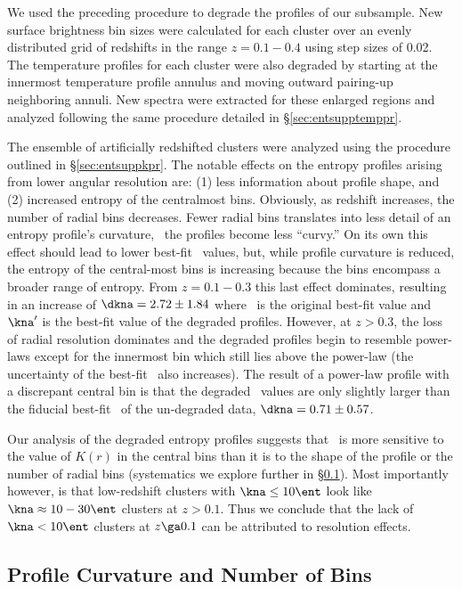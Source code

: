 We used the preceding procedure to degrade the profiles of our
subsample. New surface brightness bin sizes were calculated for each
cluster over an evenly distributed grid of redshifts in the range $z =
0.1-0.4$ using step sizes of 0.02. The temperature profiles for each
cluster were also degraded by starting at the innermost temperature
profile annulus and moving outward pairing-up neighboring annuli. New
spectra were extracted for these enlarged regions and analyzed
following the same procedure detailed in \S\ref{sec:entsupptemppr}.

The ensemble of artificially redshifted clusters were analyzed using
the procedure outlined in \S\ref{sec:entsuppkpr}. The notable effects
on the entropy profiles arising from lower angular resolution are: (1)
less information about profile shape, and (2) increased entropy of the
centralmost bins. Obviously, as redshift increases, the number of
radial bins decreases. Fewer radial bins translates into less detail
of an entropy profile's curvature, \eg\ the profiles become less
``curvy.'' On its own this effect should lead to lower best-fit
\kna\ values, but, while profile curvature is reduced, the entropy of
the central-most bins is increasing because the bins encompass a
broader range of entropy. From $z = 0.1-0.3$ this last effect
dominates, resulting in an increase of $\dkna = 2.72 \pm 1.84$ where
\kna\ is the original best-fit value and $\kna^{\prime}$ is the
best-fit value of the degraded profiles. However, at $z > 0.3$, the
loss of radial resolution dominates and the degraded profiles begin to
resemble power-laws except for the innermost bin which still lies
above the power-law (the uncertainty of the best-fit \kna\ also
increases). The result of a power-law profile with a discrepant
central bin is that the degraded \kna\ values are only slightly larger
than the fiducial best-fit \kna\ of the un-degraded data, $\dkna =
0.71 \pm 0.57$.

Our analysis of the degraded entropy profiles suggests that \kna\ is
more sensitive to the value of $K(r)$ in the central bins than it is
to the shape of the profile or the number of radial bins (systematics
we explore further in \S\ref{sec:entsuppcurve}). Most importantly
however, is that low-redshift clusters with $\kna \le 10 \ent$ look
like $\kna \approx 10-30 \ent$ clusters at $z > 0.1$. Thus we conclude
that the lack of $\kna < 10 \ent$ clusters at $z \ga 0.1$ can be
attributed to resolution effects.

\subsection{Profile Curvature and Number of Bins}
\label{sec:entsuppcurve}

